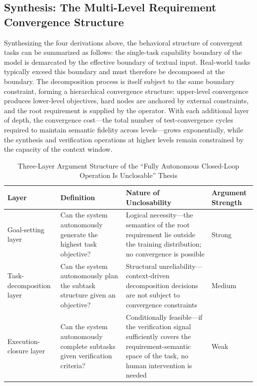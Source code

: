 \documentclass[11pt,a4paper]{article}
\theoremstyle{definition}
\begin{document}
\subsection{Synthesis: The Multi-Level Requirement Convergence Structure}

Synthesizing the four derivations above, the behavioral structure of convergent tasks can be summarized as follows: the single-task capability boundary of the model is demarcated by the effective boundary of textual input. Real-world tasks typically exceed this boundary and must therefore be decomposed at the boundary. The decomposition process is itself subject to the same boundary constraint, forming a hierarchical convergence structure: upper-level convergence produces lower-level objectives, hard nodes are anchored by external constraints, and the root requirement is supplied by the operator. With each additional layer of depth, the convergence cost---the total number of test-convergence cycles required to maintain semantic fidelity across levels---grows exponentially, while the synthesis and verification operations at higher levels remain constrained by the capacity of the context window.

\begin{table}[H]
\centering
\caption{Three-Layer Argument Structure of the ``Fully Autonomous Closed-Loop Operation Is Unclosable'' Thesis}
\begin{tabular}{@{}p{2.4cm}p{3.5cm}p{4.5cm}p{2cm}@{}}
\toprule
\textbf{Layer} & \textbf{Definition} & \textbf{Nature of Unclosability} & \textbf{Argument Strength} \\
\midrule
Goal-setting layer & Can the system autonomously generate the highest task objective? & Logical necessity---the semantics of the root requirement lie outside the training distribution; no convergence is possible & Strong \\
Task-decomposition layer & Can the system autonomously plan the subtask structure given an objective? & Structural unreliability---context-driven decomposition decisions are not subject to convergence constraints & Medium \\
Execution-closure layer & Can the system autonomously complete subtasks given verification criteria? & Conditionally feasible---if the verification signal sufficiently covers the requirement-semantic space of the task, no human intervention is needed & Weak \\
\bottomrule
\end{tabular}
\end{table}
\end{document}
